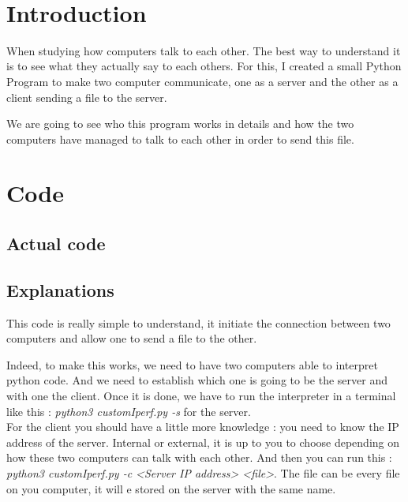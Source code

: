 \documentclass[a4paper]{article}
\title{\underline{\textbf{\begin{Huge}Network\end{Huge}}}\\\vspace{1cm}
    \begin{huge}
        \textbf{Client / Server communication study}
    \end{huge}\\}
\author{
        Tom Moulard (16920041)
        \date{}
        }
\begin{document}
\maketitle
\begin{center}
\vspace{1cm}
\date{2017 March 4}
\vspace{2cm}\\
\end{center}    
    \thispagestyle{empty}

\newpage{}

\tableofcontents
\thispagestyle{empty}


\newpage
\section{Introduction}

When studying how computers talk to each other. The best way to understand it is to see what they actually say to each others.
For this, I created a small Python Program to make two computer communicate, one as a server and the other as a client sending a file to the server.
\par We are going to see who this program works in details and how the two computers have managed to talk to each other in order to send this file.  

\newpage
\section{Code}

\subsection{Actual code}


\subsection{Explanations}
This code is really simple to understand, it initiate the connection between two computers and allow one to send a file to the other.
\par Indeed, to make this works, we need to have two computers able to interpret python code.
And we need to establish which one is going to be the server and with one the client.
Once it is done, we have to run the interpreter in a terminal like this : \textit{python3 customIperf.py -s} for the server.\\
For the client you should have a little more knowledge : you need to know the IP address of the server. Internal or external, it is up to you to choose depending on how these two computers can talk with each other. And then you can run this : \textit{python3 customIperf.py -c <Server IP address> <file>}. The file can be every file on you computer, it will e stored on the server with the same name.
\end{document}
